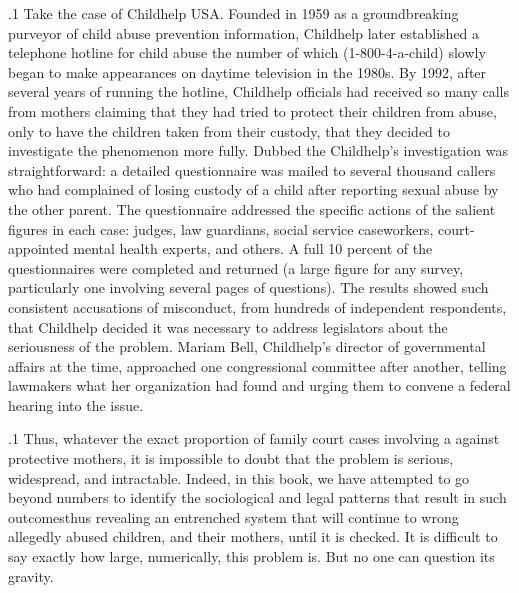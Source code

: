 \documentclass[11pt, twoside]{article}
\begin{document}
{\p.1{%
Take the case of Childhelp USA. Founded in 1959 as a groundbreaking purveyor of child abuse prevention information, Childhelp later
established a telephone hotline for child abuse  the
number of which (1-800-4-a-child) slowly began to make appearances
on daytime television in the 1980s. By 1992, after several years of running the hotline, Childhelp officials had received so many calls from
mothers claiming that they had tried to protect their children from
abuse, only to have the children taken from their custody, that they
decided to investigate the phenomenon more fully. Dubbed the  Childhelp’s investigation was straightforward: a
detailed questionnaire was mailed to several thousand callers who
had complained of losing custody of a child after reporting sexual abuse
by the other parent. The questionnaire addressed the specific actions
of the salient figures in each case: judges, law guardians, social service caseworkers, court-appointed mental health experts, and others.
A full 10 percent of the questionnaires were completed and returned
(a large figure for any survey, particularly one involving several pages
of questions). The results showed such consistent accusations of misconduct, from hundreds of independent respondents, that Childhelp
decided it was necessary to address legislators about the seriousness
of the problem. Mariam Bell, Childhelp’s director of governmental affairs at the time, approached one congressional committee after another,
telling lawmakers what her organization had found and urging them to
convene a federal hearing into the issue.
}%

\p.1{%
Thus, whatever the exact proportion of family court cases involving a  against protective mothers, it is impossible to doubt
that the problem is serious, widespread, and intractable. Indeed, in this
book, we have attempted to go beyond numbers to identify the sociological and legal patterns that result in such outcomes\mdash{}thus revealing
an entrenched system that will continue to wrong allegedly abused children, and their mothers, until it is checked. It is difficult to say exactly
how large, numerically, this problem is. But no one can question its
gravity.
}%

}
\end{document}
